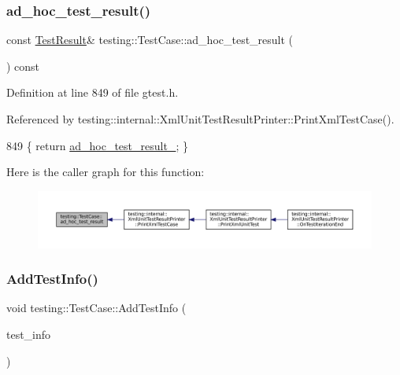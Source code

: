 \subsubsection{\texorpdfstring{ad\+\_\+hoc\+\_\+test\+\_\+result()}{ad\_hoc\_test\_result()}}
{\footnotesize\ttfamily const \hyperlink{classtesting_1_1TestResult}{Test\+Result}\& testing\+::\+Test\+Case\+::ad\+\_\+hoc\+\_\+test\+\_\+result (\begin{DoxyParamCaption}{ }\end{DoxyParamCaption}) const\hspace{0.3cm}{\ttfamily [inline]}}



Definition at line 849 of file gtest.\+h.



Referenced by testing\+::internal\+::\+Xml\+Unit\+Test\+Result\+Printer\+::\+Print\+Xml\+Test\+Case().


\begin{DoxyCode}
849 \{ \textcolor{keywordflow}{return} \hyperlink{classtesting_1_1TestCase_a4aec85d3398a4a0161f1cde69c07aadc}{ad\_hoc\_test\_result\_}; \}
\end{DoxyCode}
Here is the caller graph for this function\+:
\nopagebreak
\begin{figure}[H]
\begin{center}
\leavevmode
\includegraphics[width=350pt]{classtesting_1_1TestCase_a6d5fc5003bc3352f3ddae7dadc6d2364_icgraph}
\end{center}
\end{figure}
\mbox{\label{classtesting_1_1TestCase_a21ca9697c5f91554c752411f8ea556cf}} 
\subsubsection{\texorpdfstring{Add\+Test\+Info()}{AddTestInfo()}}
{\footnotesize\ttfamily void testing\+::\+Test\+Case\+::\+Add\+Test\+Info (\begin{DoxyParamCaption}\item[{\hyperlink{classtesting_1_1TestInfo}{Test\+Info} $\ast$}]{test\+\_\+info }\end{DoxyParamCaption})\hspace{0.3cm}{\ttfamily [private]}}



